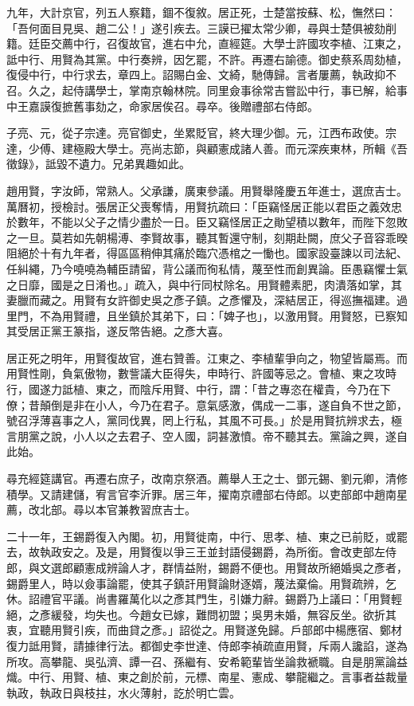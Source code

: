 \begin{pinyinscope}
九年，大計京官，列五人察籍，錮不復敘。居正死，士楚當按蘇、松，憮然曰：「吾何面目見吳、趙二公！」遂引疾去。三謨已擢太常少卿，尋與士楚俱被劾削籍。廷臣交薦中行，召復故官，進右中允，直經筵。大學士許國攻李植、江東之，詆中行、用賢為其黨。中行奏辨，因乞罷，不許。再遷右諭德。御史蔡系周劾植，復侵中行，中行求去，章四上。詔賜白金、文綺，馳傳歸。言者屢薦，執政抑不召。久之，起侍講學士，掌南京翰林院。同里僉事徐常吉嘗訟中行，事已解，給事中王嘉謨復摭舊事劾之，命家居俟召。尋卒。後贈禮部右侍郎。

子亮、元，從子宗達。亮官御史，坐累貶官，終大理少御。元，江西布政使。宗達，少傅、建極殿大學士。亮尚志節，與顧憲成諸人善。而元深疾東林，所輯《吾徵錄》，詆毀不遺力。兄弟異趣如此。

趙用賢，字汝師，常熟人。父承謙，廣東參議。用賢舉隆慶五年進士，選庶吉士。萬曆初，授檢討。張居正父喪奪情，用賢抗疏曰：「臣竊怪居正能以君臣之義效忠於數年，不能以父子之情少盡於一日。臣又竊怪居正之勛望積以數年，而陛下忽敗之一旦。莫若如先朝楊溥、李賢故事，聽其暫還守制，刻期赴闕，庶父子音容乖暌阻絕於十有九年者，得區區稍伸其痛於臨穴憑棺之一慟也。國家設臺諫以司法紀、任糾繩，乃今嘵嘵為輔臣請留，背公議而徇私情，蔑至性而創異論。臣愚竊懼士氣之日靡，國是之日淆也。」疏入，與中行同杖除名。用賢體素肥，肉潰落如掌，其妻臘而藏之。用賢有女許御史吳之彥子鎮。之彥懼及，深結居正，得巡撫福建。過里門，不為用賢禮，且坐鎮於其弟下，曰：「婢子也」，以激用賢。用賢怒，已察知其受居正黨王篆指，遂反幣告絕。之彥大喜。

居正死之明年，用賢復故官，進右贊善。江東之、李植輩爭向之，物望皆屬焉。而用賢性剛，負氣傲物，數訾議大臣得失，申時行、許國等忌之。會植、東之攻時行，國遂力詆植、東之，而陰斥用賢、中行，謂：「昔之專恣在權貴，今乃在下僚；昔顛倒是非在小人，今乃在君子。意氣感激，偶成一二事，遂自負不世之節，號召浮薄喜事之人，黨同伐異，罔上行私，其風不可長。」於是用賢抗辨求去，極言朋黨之說，小人以之去君子、空人國，詞甚激憤。帝不聽其去。黨論之興，遂自此始。

尋充經筵講官。再遷右庶子，改南京祭酒。薦舉人王之士、鄧元錫、劉元卿，清修積學。又請建儲，宥言官李沂罪。居三年，擢南京禮部右侍郎。以吏部郎中趙南星薦，改北部。尋以本官兼教習庶吉士。

二十一年，王錫爵復入內閣。初，用賢徙南，中行、思孝、植、東之已前貶，或罷去，故執政安之。及是，用賢復以爭三王並封語侵錫爵，為所銜。會改吏部左侍郎，與文選郎顧憲成辨論人才，群情益附，錫爵不便也。用賢故所絕婚吳之彥者，錫爵里人，時以僉事論罷，使其子鎮訐用賢論財逐婿，蔑法棄倫。用賢疏辨，乞休。詔禮官平議。尚書羅萬化以之彥其門生，引嫌力辭。錫爵乃上議曰：「用賢輕絕，之彥緩發，均失也。今趙女已嫁，難問初盟；吳男未婚，無容反坐。欲折其衷，宜聽用賢引疾，而曲貸之彥。」詔從之。用賢遂免歸。戶部郎中楊應宿、鄭材復力詆用賢，請據律行法。都御史李世達、侍郎李禎疏直用賢，斥兩人讒諂，遂為所攻。高攀龍、吳弘濟、譚一召、孫繼有、安希範輩皆坐論救褫職。自是朋黨論益熾。中行、用賢、植、東之創於前，元標、南星、憲成、攀龍繼之。言事者益裁量執政，執政日與枝拄，水火薄射，訖於明亡雲。


\end{pinyinscope}
